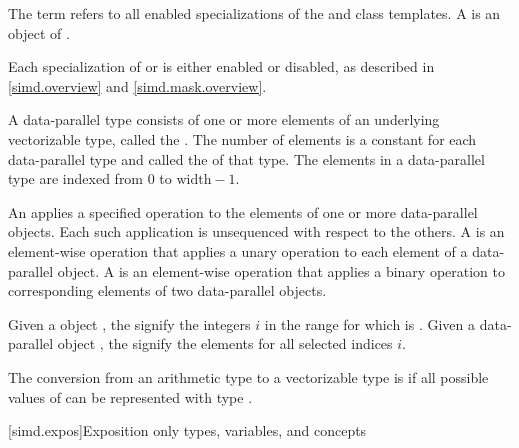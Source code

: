 \pnum
The term  refers to all enabled specializations of
the  and  class templates. A  is
an object of .

\pnum
Each specialization of  or  is either enabled or disabled,
as described in \ref{simd.overview} and \ref{simd.mask.overview}.

\pnum
A data-parallel type consists of one or more elements of an underlying vectorizable type,
called the .
The number of elements is a constant for each data-parallel type and called the
 of that type.
The elements in a data-parallel type are indexed from 0 to $\textrm{width} - 1$.

\pnum
An  applies a specified operation to the elements of one or more
data-parallel objects. Each such application is unsequenced with respect to the others. A
 is an element-wise operation that applies a unary operation to
each element of a data-parallel object. A  is an element-wise
operation that applies a binary operation to corresponding elements of two data-parallel objects.

\pnum\label{wording.selected.indices}%
Given a  object , the
 signify the integers $i$ in the range
 for which  is .
Given a data-parallel object , the  signify the elements
 for all selected indices $i$.

\pnum
The conversion from an arithmetic type  to a vectorizable type  is
 if
all possible values of  can be represented with type .

[simd.expos]{Exposition only types, variables, and concepts}

